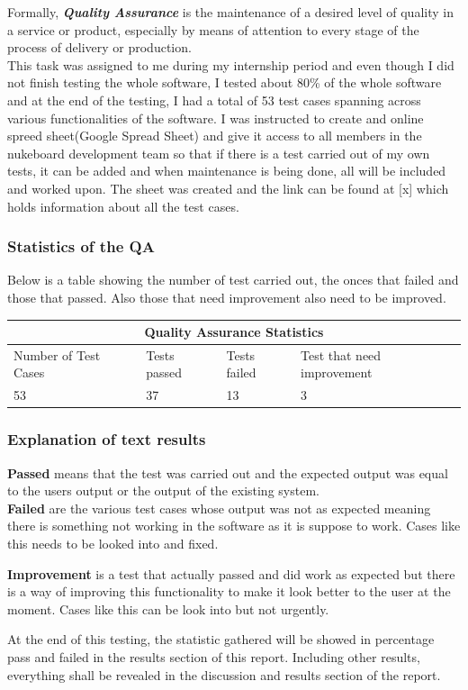 Formally, \textbf{\textit{Quality Assurance}} is the maintenance of a desired level of quality in a service or product, especially by means of attention to every stage of the process of delivery or production. \\

This task was assigned to me during my internship period and even though I did not finish testing the whole software, I tested about 80\% of the whole software and at the end of the testing, I had a total of 53 test cases spanning across various functionalities of the software. I was instructed to create and online spreed sheet(Google Spread Sheet) and give it access to all members in the nukeboard development team so that if there is a test carried out of my own tests, it can be added and when maintenance is being done, all will be included and worked upon. The sheet was created and the link can be found at [x] which holds information about all the test cases.

\subsubsection{Statistics of the QA}

Below is a table showing the number of test carried out, the onces that failed and those that passed. Also those that need improvement also need to be improved. \\

\begin{tabular}{ |p{3cm}|p{3cm}|p{3cm}|p{3cm}|  }
 \hline
 \multicolumn{4}{|c|}{Quality Assurance Statistics} \\
 \hline
 Number of Test Cases & Tests passed & Tests failed & Test that need improvement\\
 \hline
 53  & 37 & 13 & 3\\
 \hline
\end{tabular}

\subsubsection{Explanation of text results}

\textbf{Passed }means that the test was carried out and the expected output was equal to the users output or the output of the existing system. \\

\textbf{Failed }are the various test cases whose output was not as expected meaning there is something not working in the software as it is suppose to work. Cases like this needs to be looked into and fixed.

\textbf{Improvement } is a test that actually passed and did work as expected but there is a way of improving this functionality to make it look better to the user at the moment. Cases like this can be look into but not urgently.

At the end of this testing, the statistic gathered will be showed in percentage pass and failed in the results section of this report. Including other results, everything shall be revealed in the discussion and results section of the report.

